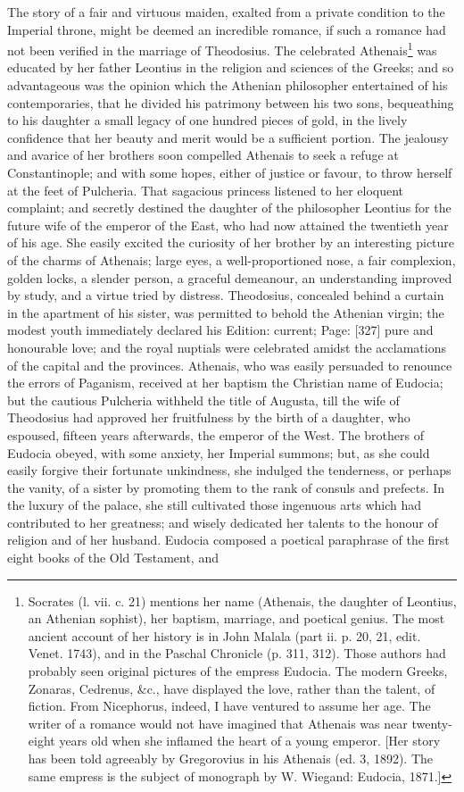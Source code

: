 The story of a fair and virtuous maiden, exalted from a private condition to the Imperial throne, might be deemed an incredible romance, if such a romance had not been verified in the marriage of Theodosius. The celebrated Athenais\footnote{Socrates (l. vii. c. 21) mentions her name (Athenais, the daughter of Leontius, an Athenian sophist), her baptism, marriage, and poetical genius. The most ancient account of her history is in John Malala (part ii. p. 20, 21, edit. Venet. 1743), and in the Paschal Chronicle (p. 311, 312). Those authors had probably seen original pictures of the empress Eudocia. The modern Greeks, Zonaras, Cedrenus, \&c., have displayed the love, rather than the talent, of fiction. From Nicephorus, indeed, I have ventured to assume her age. The writer of a romance would not have imagined that Athenais was near twenty-eight years old when she inflamed the heart of a young emperor. [Her story has been told agreeably by Gregorovius in his Athenais (ed. 3, 1892). The same empress is the subject of monograph by W. Wiegand: Eudocia, 1871.]} was educated by her father Leontius in the religion and sciences of the Greeks; and so advantageous was the opinion which the Athenian philosopher entertained of his contemporaries, that he divided his patrimony between his two sons, bequeathing to his daughter a small legacy of one hundred pieces of gold, in the lively confidence that her beauty and merit would be a sufficient portion. The jealousy and avarice of her brothers soon compelled Athenais to seek a refuge at Constantinople; and with some hopes, either of justice or favour, to throw herself at the feet of Pulcheria. That sagacious princess listened to her eloquent complaint; and secretly destined the daughter of the philosopher Leontius for the future wife of the emperor of the East, who had now attained the twentieth year of his age. She easily excited the curiosity of her brother by an interesting picture of the charms of Athenais; large eyes, a well-proportioned nose, a fair complexion, golden locks, a slender person, a graceful demeanour, an understanding improved by study, and a virtue tried by distress. Theodosius, concealed behind a curtain in the apartment of his sister, was permitted to behold the Athenian virgin; the modest youth immediately declared his Edition: current; Page: [327] pure and honourable love; and the royal nuptials were celebrated amidst the acclamations of the capital and the provinces. Athenais, who was easily persuaded to renounce the errors of Paganism, received at her baptism the Christian name of Eudocia; but the cautious Pulcheria withheld the title of Augusta, till the wife of Theodosius had approved her fruitfulness by the birth of a daughter, who espoused, fifteen years afterwards, the emperor of the West. The brothers of Eudocia obeyed, with some anxiety, her Imperial summons; but, as she could easily forgive their fortunate unkindness, she indulged the tenderness, or perhaps the vanity, of a sister by promoting them to the rank of consuls and prefects. In the luxury of the palace, she still cultivated those ingenuous arts which had contributed to her greatness; and wisely dedicated her talents to the honour of religion and of her husband. Eudocia composed a poetical paraphrase of the first eight books of the Old Testament, and 